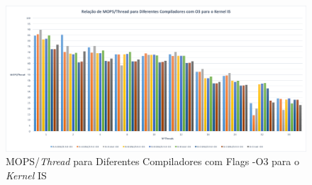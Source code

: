 \documentclass[conference,compsoc]{IEEEtran}
\begin{document}
\begin{figure}[h!]
\centering
\includegraphics[scale=0.225]{OMP/mops-thread_dif_comp-O3_IS_nodo-641.png}
\caption{MOPS/\textit{Thread} para Diferentes Compiladores com Flags -O3 para o \textit{Kernel} IS}
\end{figure}

\end{document}
